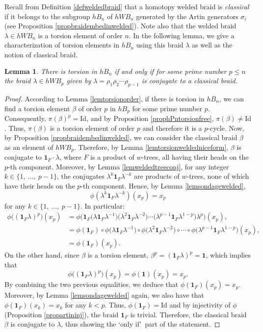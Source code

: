\documentclass[11pt, a4paper, twoside,reqno]{amsart}
\theoremstyle{plain}
\newtheorem{lem}[thm]{Lemma}
\theoremstyle{definition}
\theoremstyle{remark}
\begin{document}
Recall from Definition \ref{defweldedbraid} that a homotopy welded braid is \emph{classical} if it belongs to the subgroup $hB_n$ of $hWB_n$ generated by the Artin generators $\sigma_i$ (see Proposition \ref{propbraidembedinwelded}). Note also that the welded braid $\lambda\in hWB_n$ is a torsion element of order $n$. In the following lemma, we give a characterization of torsion elements in $hB_n$ using this braid $\lambda$ as well as the notion of classical braid.
\begin{lem}\label{lemtorsionweldedconj}
There is torsion in $hB_n$ if and only if for some prime number $p\leq n$ the braid $\lambda\in hWB_p$ given by $\lambda=\rho_1\rho_2\cdots\rho_{p-1}$ is conjugate to a classical braid.
\end{lem}
\begin{proof}
According to Lemma \ref{lemtorsionorder}, if there is torsion in $hB_n$, we can find a torsion element $\beta$ of order $p$ in $hB_p$ for some prime number $p$. Consequently, $\pi(\beta)^p=\mathrm{Id}$, and by Proposition \ref{prophPntorsionfree}, $\pi(\beta)\neq\mathrm{Id}$. Thus, $\pi(\beta)$ is a torsion element of order $p$ and therefore it is a $p$-cycle. Now, by Proposition \ref{propbraidembedinwelded}, we can consider the classical braid $\beta$ as an element of $hWB_p$. Therefore, by Lemma \ref{lemtorsionweldedniceform}, $\beta$ is conjugate to $\mathbf 1_{F}\cdot\lambda$, where $F$ is a product of $w$-trees, all having their heads on the $p$-th component. Moreover, by Lemma \ref{lemweldedtreeconj}, for any integer $k\in\{1,\ \ldots,\ p-1\}$, the conjugates $\lambda^k\mathbf 1_{F}\lambda^{-k}$ are products of $w$-trees, none of which have their heads on the $p$-th component. Hence, by Lemma \ref{lemsondagewelded},$$\phi\left(\lambda^k\mathbf 1_{F}\lambda^{-k}\right)(x_p)=x_p$$ for any $k\in\{1,\ \ldots,\ p-1\}$. In particular:
\begin{align*}
    \phi\big((\mathbf 1_{F}  \lambda)^p\big)(x_p)&=\phi\Big(\mathbf 1_{F}\big(\lambda\mathbf 1_{F}\lambda^{-1}\big)\big(\lambda^2\mathbf 1_{F}\lambda^{-2}\big)\cdots\big(\lambda^{p-1}\mathbf 1_{F}\lambda^{1-p}\big)\lambda^p\Big)(x_p),\\
    &=\phi(\mathbf 1_{F})\circ\phi\big(\lambda\mathbf 1_{F}\lambda^{-1}\big)\circ\phi\big(\lambda^2\mathbf 1_{F}\lambda^{-2}\big)\circ\cdots\circ\phi\big(\lambda^{p-1}\mathbf 1_{F}\lambda^{1-p}\big)(x_p),\\
    &=\phi(\mathbf 1_{F})(x_p).
\end{align*}
On the other hand, since $\beta$ is a torsion element, $\beta^p=(\mathbf 1_{F}\lambda)^p=\mathbf1$, which implies that $$\phi\big((\mathbf 1_{F}\lambda)^p\big)(x_p)=\phi(\mathbf 1)(x_p)=x_p.$$
By combining the two previous equalities, we deduce that $\phi(\mathbf 1_{F})(x_p)=x_p$. Moreover, by Lemma \ref{lemsondagewelded} again, we also have that $\phi(\mathbf 1_{F})(x_k)=x_k$ for any $k<p$. Thus, $\phi(\mathbf 1_{F})=\mathrm{Id}$ and by injectivity of $\phi$ (Proposition \ref{propartininj}), the braid $\mathbf 1_{F}$ is trivial. Therefore, the classical braid $\beta$ is conjugate to $\lambda$, thus showing the \lq only if\rq\, part of the statement.


\end{proof}
\end{document}
